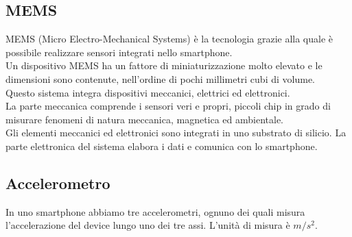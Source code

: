 \documentclass[12pt,a4paper,openright,twoside]{report}
\begin{document}
\subsection{MEMS}
MEMS (Micro Electro-Mechanical Systems) è la tecnologia grazie alla quale è possibile realizzare sensori integrati nello smartphone.\\
Un dispositivo MEMS ha un fattore di miniaturizzazione molto elevato e le dimensioni sono contenute, nell'ordine di pochi millimetri cubi di volume.\\
Questo sistema integra dispositivi meccanici, elettrici ed elettronici.\\
La parte meccanica comprende i sensori veri e propri, piccoli chip in grado di misurare fenomeni di natura meccanica, magnetica ed ambientale.\\
Gli elementi meccanici ed elettronici sono integrati in uno substrato di silicio. La parte elettronica del sistema elabora i dati e comunica con lo smartphone. \cite{K14}

\subsection{Accelerometro}
In uno smartphone abbiamo tre accelerometri, ognuno dei quali misura l'accelerazione del device lungo uno dei tre assi. L'unità di misura è $m/s^2$.
\end{document}
